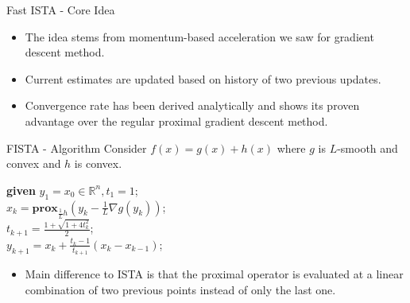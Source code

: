 \documentclass{beamer}
\begin{document}
\begin{frame}{Fast ISTA - Core Idea}
\begin{itemize}
    \item The idea stems from momentum-based acceleration we saw for gradient descent method.
    \item Current estimates are updated based on history of two previous updates.
    \item Convergence rate has been derived analytically and shows its proven advantage over the regular proximal gradient descent method. 
\end{itemize}
\end{frame}



\begin{frame}{FISTA - Algorithm}
Consider $f(x)=g(x)+h(x)$ where $g$ is $L$-smooth and convex and $h$ is convex.\\
\vspace{20pt}
\begin{algorithm}[H]
        
    	\textbf{given} $y_1 = x_0 \in \mathbb{R}^n, t_1 =1$;\\
     	{
      		$x_k = \mathbf{prox}_{\frac{1}{L}h}(y_k-\frac{1}{L}\nabla g(y_k))$;\\
                $t_{k+1} = \frac{1 + \sqrt{1 + 4t_k^2}}{2}$;\\
                $y_{k+1} = x_k + \frac{t_k - 1}{t_{k+1}} (x_k - x_{k-1})$;
      	}
    \end{algorithm}
\pause
\vspace{10pt}
\begin{itemize}
    \item Main difference to ISTA is that the proximal operator is evaluated at a linear combination of two previous points instead of only the last one.
\end{itemize}

\end{frame}
\end{document}

